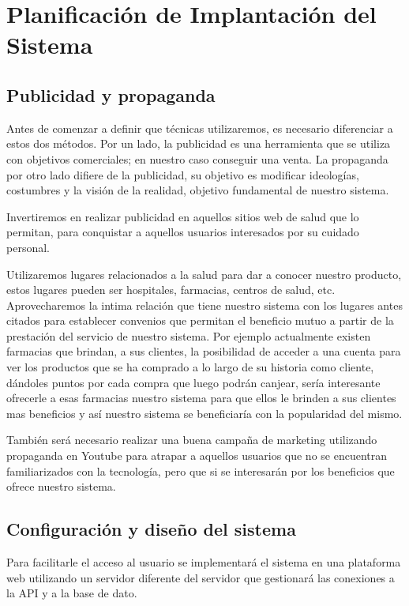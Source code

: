 \documentclass[a4paper,12pt]{article}
\begin{document}
\section{Planificación de Implantación del Sistema}

\subsection{Publicidad y propaganda}

Antes de comenzar a definir que técnicas utilizaremos, es necesario diferenciar a estos dos métodos. Por un lado, la publicidad es una herramienta que se utiliza con objetivos comerciales; en nuestro caso conseguir una venta. La propaganda por otro lado difiere de la publicidad, su objetivo es modificar ideologías, costumbres y la visión de la realidad, objetivo fundamental de nuestro sistema.

Invertiremos en realizar publicidad en aquellos sitios web de salud que lo permitan, para conquistar a aquellos usuarios interesados por su cuidado personal.

Utilizaremos lugares relacionados a la salud para dar a conocer nuestro producto, estos lugares pueden ser hospitales, farmacias, centros de salud, etc. Aprovecharemos la intima relación que tiene nuestro sistema con los lugares antes citados para establecer  convenios que permitan el beneficio mutuo  a partir de la prestación del servicio de nuestro sistema. 
Por ejemplo actualmente existen farmacias que brindan, a sus clientes, la posibilidad  de acceder a una cuenta para ver  los productos que se ha comprado a lo largo de su historia como cliente, dándoles puntos por cada compra que luego podrán canjear, sería interesante ofrecerle a esas farmacias nuestro sistema para que ellos le brinden a sus clientes mas beneficios y así nuestro sistema se beneficiaría con la popularidad del mismo.

También será necesario realizar una buena campaña de marketing utilizando propaganda en Youtube para atrapar a aquellos usuarios que no se encuentran familiarizados con la tecnología, pero que si se interesarán por los beneficios que ofrece nuestro sistema.

\subsection{Configuración y diseño del sistema}
Para facilitarle el acceso al usuario se implementará el sistema en una plataforma web utilizando un servidor diferente del servidor que gestionará las conexiones a la  API y a la base de dato.
\end{document}
